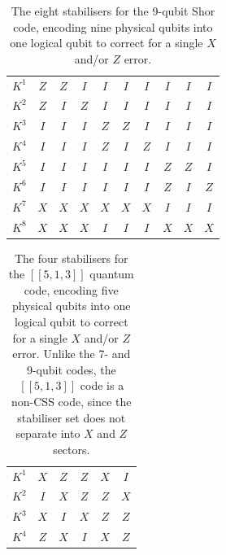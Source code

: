 \startnormtable
\begin{table}[htbp!]
\begin{center}
\vspace*{4pt}   
\begin{tabular}{|c|c|c|c|c|c|c|c|c|c|}
\hline
$K^1$ & $Z$&$Z$&$I$&$I$&$I$&$I$&$I$&$I$&$I$ \\
$K^2$ & $Z$&$I$&$Z$&$I$&$I$&$I$&$I$&$I$&$I$ \\
$K^3$ & $I$&$I$&$I$&$Z$&$Z$&$I$&$I$&$I$&$I$ \\
$K^4$ & $I$&$I$&$I$&$Z$&$I$&$Z$&$I$&$I$&$I$ \\
$K^5$ & $I$&$I$&$I$&$I$&$I$&$I$&$Z$&$Z$&$I$ \\
$K^6$ & $I$&$I$&$I$&$I$&$I$&$I$&$Z$&$I$&$Z$ \\
$K^7$ & $X$&$X$&$X$&$X$&$X$&$X$&$I$&$I$&$I$ \\
$K^8$ & $X$&$X$&$X$&$I$&$I$&$I$&$X$&$X$&$X$ \\
\hline
\end{tabular}
\caption{The eight stabilisers for the 9-qubit Shor code, encoding nine physical qubits into one logical qubit to correct for a single $X$ and/or $Z$ error.} 
\label{tab:9qubit}
\end{center}
\end{table} 

\begin{table}[htbp!]
\begin{center}
\vspace*{4pt}   
\begin{tabular}{|c|c|c|c|c|c|}
\hline
$K^1$ & $X$&$Z$&$Z$&$X$&$I$ \\
$K^2$ & $I$&$X$&$Z$&$Z$&$X$ \\
$K^3$ & $X$&$I$&$X$&$Z$&$Z$ \\
$K^4$ & $Z$&$X$&$I$&$X$&$Z$ \\
\hline
\end{tabular}
\caption{The four stabilisers for the $[[5,1,3]]$ quantum code, encoding five physical qubits into one logical qubit to correct for a single $X$ and/or $Z$ error. Unlike the 7- and 9-qubit codes, the $[[5,1,3]]$ code is a non-CSS code, since the stabiliser set does not separate into $X$ and $Z$ sectors.} 
\label{tab:5qubit}
\end{center}
\end{table} 


